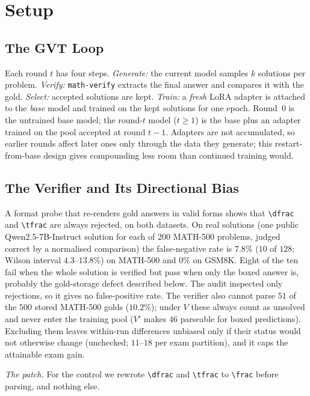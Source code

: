 \documentclass[runningheads]{llncs}
\begin{document}
\section{Setup}
\label{sec:setup}

\subsection{The GVT Loop}
\label{sec:loop}

Each round $t$ has four steps. \emph{Generate:} the current model samples $k$
solutions per problem. \emph{Verify:} \texttt{math-verify} extracts the final
answer and compares it with the gold. \emph{Select:} accepted solutions are kept.
\emph{Train:} a \emph{fresh} LoRA adapter is attached to the \emph{base} model and
trained on the kept solutions for one epoch. Round~0 is the untrained base model;
the round-$t$ model ($t\ge1$) is the base plus an adapter trained on the pool
accepted at round $t-1$. Adapters are not accumulated, so earlier rounds affect
later ones only through the data they generate; this restart-from-base design gives
compounding less room than continued training would.

\subsection{The Verifier and Its Directional Bias}
\label{sec:verifier}

A format probe that re-renders gold answers in valid forms shows
that \verb|\dfrac| and \verb|\tfrac| are always rejected, on both
datasets. On real solutions (one public
Qwen2.5-7B-Instruct solution for each of $200$ MATH-500 problems, judged
correct by a normalised comparison) the false-negative rate is
$7.8\%$ ($10$ of $128$; Wilson interval $4.3$--$13.8\%$) on MATH-500 and $0\%$
on GSM8K. Eight of the ten fail when the whole solution is verified but pass
when only the boxed answer is, probably the gold-storage defect described below. The audit inspected only rejections, so it gives no
false-positive rate. The verifier also cannot parse $51$ of the $500$ stored
MATH-500 golds ($10.2\%$); under $V$ these always count as unsolved and never
enter the training pool ($V'$ makes $46$ parseable for boxed predictions). Excluding them
leaves within-run differences unbiased only if their status would not otherwise change
(unchecked; $11$--$18$ per exam partition), and it caps the attainable exam gain.

\emph{The patch.} For the control we rewrote \verb|\dfrac| and \verb|\tfrac| to
\verb|\frac| before parsing, and nothing else.
\end{document}

